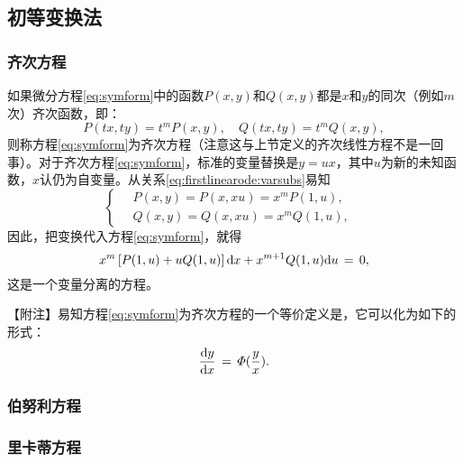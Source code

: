 \subsection{初等变换法}
\subsubsection{齐次方程}
如果微分方程\eqref{eq:symform}中的函数$P(x,y)$和$Q(x,y)$都是$x$和$y$的同次（例如$m$次）齐次函数，即：
\begin{equation}\label{eq:firstlinearode:varsubs}
P(tx,ty)=t^mP(x,y),\quad Q(tx,ty)=t^mQ(x,y),
\end{equation}
则称方程\eqref{eq:symform}为{\heiti 齐次方程}（注意这与上节定义的齐次线性方程不是一回事）。对于齐次方程\eqref{eq:symform}，标准的变量替换是$y=ux$，其中$u$为新的未知函数，$x$认仍为自变量。从关系\eqref{eq:firstlinearode:varsubs}易知
\begin{equation*}
    \begin{cases}
        \quad P(x,y)=P(x,xu)=x^mP(1,u), &\\
        \quad Q(x,y)=Q(x,xu)=x^mQ(1,u), &
    \end{cases}
\end{equation*}
因此，把变换代入方程\eqref{eq:symform}，就得
$$x^m\left[P(1,u)+uQ(1,u)\right]\mathrm{d} x+x^{m+1}Q(1,u)\mathrm{d} u\,=\,0,$$
这是一个变量分离的方程。\par
{\heiti 【附注】\quad}易知方程\eqref{eq:symform}为齐次方程的一个等价定义是，它可以化为如下的形式：
$$\frac{\mathrm{d} y}{\mathrm{d} x}\,=\,\varPhi(\frac yx).$$

\subsubsection{伯努利方程}

\subsubsection{里卡蒂方程}